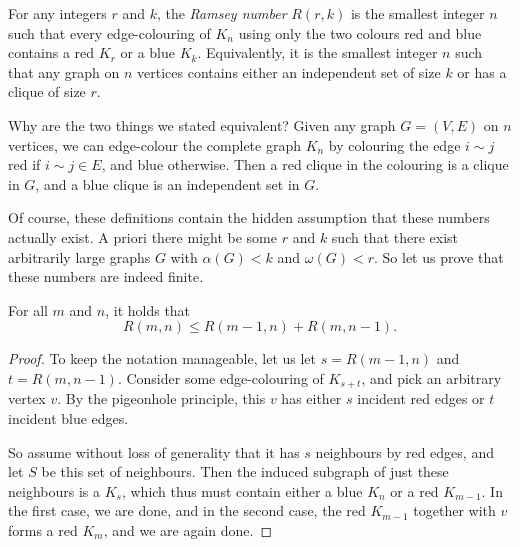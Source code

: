 \documentclass[nobib]{tufte-handout}
\begin{document}
\begin{definition}
  For any integers $r$ and $k$, the \emph{Ramsey number} $R(r,k)$ is the smallest integer $n$ such that every edge-colouring of $K_n$ using only the two colours red and blue contains a red $K_r$ or a blue $K_k$. Equivalently, it is the smallest integer $n$ such that any graph on $n$ vertices contains either an independent set of size $k$ or has a clique of size $r$.
\end{definition}

\begin{remark}
  Why are the two things we stated equivalent? Given any graph $G = (V,E)$ on $n$ vertices, we can edge-colour the complete graph $K_n$ by colouring the edge $i \sim j$ red if $i \sim j \in E$, and blue otherwise. Then a red clique in the colouring is a clique in $G$, and a blue clique is an independent set in $G$.
\end{remark}

Of course, these definitions contain the hidden assumption that these numbers actually exist. A priori there might be some $r$ and $k$ such that there exist arbitrarily large graphs $G$ with $\alpha(G) < k$ and $\omega(G) < r$. So let us prove that these numbers are indeed finite.

\begin{lemma}\label{lemma:ramsey_recursion_ub}
  For all $m$ and $n$, it holds that
  $$R(m,n) \leq R(m-1,n) + R(m, n-1).$$

  \begin{proof}
    To keep the notation manageable, let us let $s = R(m-1, n)$ and $t = R(m, n-1)$. Consider some edge-colouring of $K_{s+t}$, and pick an arbitrary vertex $v$. By the pigeonhole principle, this $v$ has either $s$ incident red edges or $t$ incident blue edges.

    So assume without loss of generality that it has $s$ neighbours by red edges, and let $S$ be this set of neighbours. Then the induced subgraph of just these neighbours is a $K_s$, which thus must contain either a blue $K_n$ or a red $K_{m-1}$. In the first case, we are done, and in the second case, the red $K_{m-1}$ together with $v$ forms a red $K_m$, and we are again done.
  \end{proof}
\end{lemma}
\end{document}
